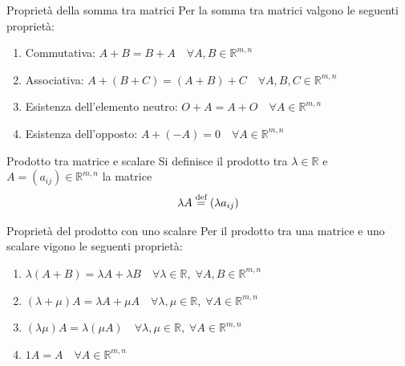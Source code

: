 \begin{SubDef}{Proprietà della somma tra matrici}
  Per la somma tra matrici valgono le seguenti proprietà:
  \begin{enumerate}
    \item Commutativa: $A+B = B+A\quad\forall A,B\in\mathbb{R}^{m,n}$
    \item Associativa: $A+(B+C) = (A+B)+C\quad\forall A,B,C\in\mathbb{R}^{m,n}$
    \item Esistenza dell'elemento neutro: $O+A = A+O\quad\forall A\in\mathbb{R}^{m,n}$
    \item Esistenza dell'opposto: $A+(-A) = 0\quad\forall A\in\mathbb{R}^{m,n}$
  \end{enumerate}
\end{SubDef}

\begin{Def}{Prodotto tra matrice e scalare}\label{def:matrice_prodotto_scalare}
  Si definisce il prodotto tra $\lambda\in\mathbb{R}$ e $A=(a_{ij})\in\mathbb{R}^{m,n}$
  la matrice
  \begin{equation*}
    \lambda A\overset{\text{def}}{=}(\lambda a_{ij})
  \end{equation*}
\end{Def}

\begin{SubDef}{Proprietà del prodotto con uno scalare}
  Per il prodotto tra una matrice e uno scalare vigono le seguenti proprietà:
  \begin{enumerate}
    \item $\lambda(A+B) = \lambda A + \lambda B\quad\forall\lambda\in\mathbb{R},\;
      \forall A,B\in\mathbb{R}^{m,n}$
    \item $(\lambda+\mu)A = \lambda A + \mu A\quad\forall\lambda,\mu\in\mathbb{R},\;
      \forall A\in\mathbb{R}^{m,n}$
    \item $(\lambda\mu)A = \lambda(\mu A)\quad\forall\lambda,\mu\in\mathbb{R},\;
      \forall A\in\mathbb{R}^{m,n}$
    \item $1A = A\quad\forall A\in\mathbb{R}^{m,n}$
  \end{enumerate}
\end{SubDef}

